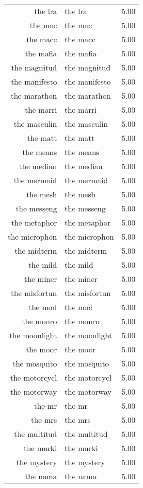 \begin{table}[ht]
\begin{tabular}{rlr}
  the lra & the lra & 5.00 \\ 
  the mac & the mac & 5.00 \\ 
  the macc & the macc & 5.00 \\ 
  the mafia & the mafia & 5.00 \\ 
  the magnitud & the magnitud & 5.00 \\ 
  the manifesto & the manifesto & 5.00 \\ 
  the marathon & the marathon & 5.00 \\ 
  the marri & the marri & 5.00 \\ 
  the masculin & the masculin & 5.00 \\ 
  the matt & the matt & 5.00 \\ 
  the means & the means & 5.00 \\ 
  the median & the median & 5.00 \\ 
  the mermaid & the mermaid & 5.00 \\ 
  the mesh & the mesh & 5.00 \\ 
  the messeng & the messeng & 5.00 \\ 
  the metaphor & the metaphor & 5.00 \\ 
  the microphon & the microphon & 5.00 \\ 
  the midterm & the midterm & 5.00 \\ 
  the mild & the mild & 5.00 \\ 
  the miner & the miner & 5.00 \\ 
  the misfortun & the misfortun & 5.00 \\ 
  the mod & the mod & 5.00 \\ 
  the monro & the monro & 5.00 \\ 
  the moonlight & the moonlight & 5.00 \\ 
  the moor & the moor & 5.00 \\ 
  the mosquito & the mosquito & 5.00 \\ 
  the motorcycl & the motorcycl & 5.00 \\ 
  the motorway & the motorway & 5.00 \\ 
  the mr & the mr & 5.00 \\ 
  the mrs & the mrs & 5.00 \\ 
  the multitud & the multitud & 5.00 \\ 
  the murki & the murki & 5.00 \\ 
  the mystery & the mystery & 5.00 \\ 
  the nama & the nama & 5.00 \\ 

\end{tabular}
\end{table}
